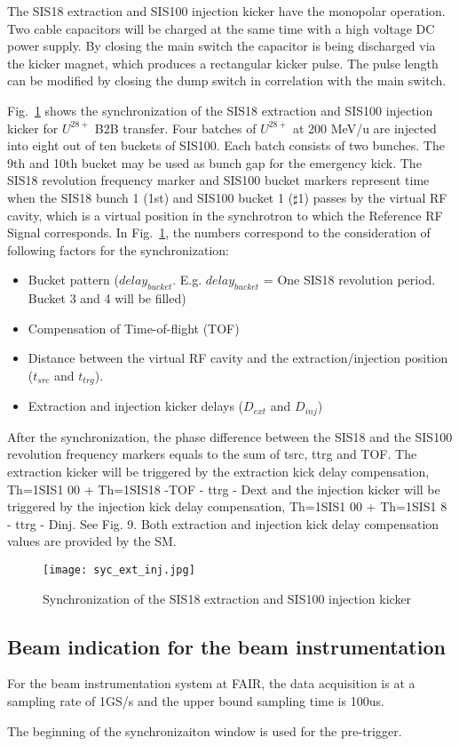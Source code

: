 The SIS18 extraction and SIS100 injection kicker have the monopolar operation. Two cable capacitors will be charged at the same time with a high voltage DC power supply. By closing the main switch the capacitor is being discharged via the kicker magnet, which produces a rectangular kicker pulse. The pulse length can be modified by closing the dump switch in correlation with the main switch. 

Fig.~\ref{syc_ext_inj} shows the synchronization of the SIS18 extraction and SIS100 injection kicker for $U^{28+}$ B2B transfer. Four batches of $U^{28+}$ at 200 MeV/u are injected into eight out of ten buckets of SIS100. Each batch consists of two bunches. The 9th and 10th bucket may be used as bunch gap for the emergency kick. The SIS18 revolution frequency marker and SIS100 bucket markers represent time when the SIS18 bunch 1 (1st) and SIS100 bucket 1 ($\sharp$1) passes by the virtual RF cavity, which is a virtual position in the synchrotron to which the Reference RF Signal corresponds. In Fig.~\ref{syc_ext_inj}, the numbers correspond to the
consideration of following factors for the synchronization:
\begin{itemize}
\item Bucket pattern ($delay_{bucket}$. E.g. $delay_{bucket}$ = One SIS18 revolution period. Bucket 3 and 4 will be filled)
\item Compensation of Time-of-flight (TOF)
\item Distance between the virtual RF cavity and the extraction/injection position ($t_{src}$ and $t_{trg}$).
\item Extraction and injection kicker delays ($D_{ext}$ and $D_{inj}$)
\end{itemize}
After the synchronization, the phase difference between the SIS18 and the SIS100 revolution frequency markers equals to the sum of tsrc, ttrg and TOF. The extraction kicker will be triggered by the extraction kick delay compensation, Th=1SIS1 00 +
Th=1SIS18 -TOF - ttrg - Dext and the injection kicker will be triggered by the injection kick
delay compensation, Th=1SIS1 00 + Th=1SIS1 8 - ttrg - Dinj. See Fig. 9. Both extraction and
injection kick delay compensation values are provided by the SM.
 
\begin{figure}[!htb]
   \centering   
   \texttt{[image: syc\_ext\_inj.jpg]}
   \caption{Synchronization of the SIS18 extraction and SIS100 injection kicker}
   \label{syc_ext_inj}
\end{figure}

\subsection{Beam indication for the beam instrumentation}

For the beam instrumentation system at FAIR, the data acquisition is at a sampling rate of 1GS/s and the upper bound sampling time is 100us. 

The beginning of the synchronizaiton window is used for the pre-trigger. 
